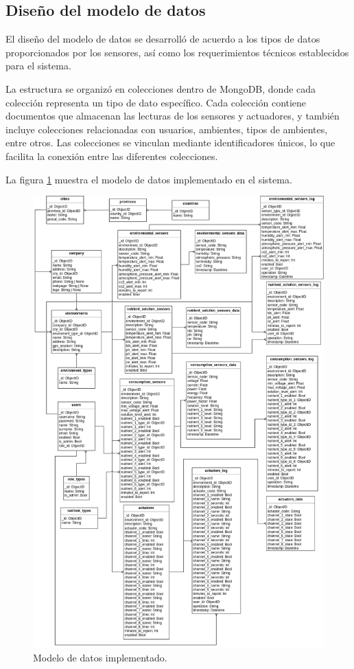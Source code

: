 \subsection{Diseño del modelo de datos}

El diseño del modelo de datos se desarrolló de acuerdo a los tipos de datos
proporcionados por los sensores, así como los requerimientos técnicos
establecidos para el sistema.

La estructura se organizó en colecciones dentro de MongoDB, donde cada
colección representa un tipo de dato específico. Cada colección contiene
documentos que almacenan las lecturas de los sensores y actuadores, y también
incluye colecciones relacionadas con usuarios, ambientes, tipos de ambientes,
entre otros. Las colecciones se vinculan mediante identificadores únicos, lo
que facilita la conexión entre las diferentes colecciones.

La figura \ref{fig:modelo de datos} muestra el modelo de datos implementado en
el sistema.
\begin{figure}[H]
    \centering
    \includegraphics[width=.99\textwidth]{./Images/15.png}
    \caption{Modelo de datos implementado.}
    \label{fig:modelo de datos}
\end{figure}

